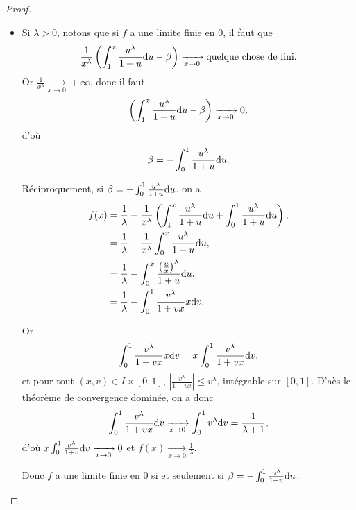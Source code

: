 \documentclass[12pt]{article}
\begin{document}
\begin{proof}
\begin{enumerate}
\begin{itemize}
\begin{itemize}
\begin{itemize}
					\item \underline{Si $\lambda>0$}, notons que si $f$ a une limite finie en 0, il faut que 
					\begin{equation}
						\frac{1}{x^{\lambda}}\left(\int_{1}^{x}\frac{u^{\lambda}}{1+u}\mathrm{d} u-\beta\right)\xrightarrow[x\to0]{}\text{quelque chose de fini.}
					\end{equation}
					Or $\frac{1}{x^{\lambda}}\xrightarrow[x\to0]{}+\infty$, donc il faut 
					\begin{equation}
						\left(\int_{1}^{x}\frac{u^{\lambda}}{1+u}\mathrm{d} u-\beta\right)\xrightarrow[x\to0]{}0,
					\end{equation}
					d'où 
					\begin{equation}
						\beta=-\int_{0}^{1}\frac{u^{\lambda}}{1+u}\mathrm{d} u.
					\end{equation}

					Réciproquement, si $\beta=-\int_{0}^{1}\frac{u^{\lambda}}{1+u}\mathrm{d} u$, on a 
					\begin{align}
						f(x)
						&=\frac{1}{\lambda}-\frac{1}{x^{\lambda}}\left(\int_{1}^{x}\frac{u^{\lambda}}{1+u}\mathrm{d} u+\int_{0}^{1}\frac{u^{\lambda}}{1+u}\mathrm{d} u\right),\\
						&=\frac{1}{\lambda}-\frac{1}{x^{\lambda}}\int_{0}^{x}\frac{u^{\lambda}}{1+u}\mathrm{d} u,\\
						&=\frac{1}{\lambda}-\int_{0}^{x}\frac{\left(\frac{u}{x}\right)^{\lambda}}{1+u}\mathrm{d} u,\\
						&=\frac{1}{\lambda}-\int_{0}^{1}\frac{v^{\lambda}}{1+vx}x\mathrm{d} v.
					\end{align}

					Or 
					\begin{equation}
						\int_{0}^{1}\frac{v^{\lambda}}{1+vx}x\mathrm{d} v=x\int_{0}^{1}\frac{v^{\lambda}}{1+vx}\mathrm{d} v,
					\end{equation}
					et pour tout $(x,v)\in I\times[0,1]$, $\left\lvert\frac{v^{\lambda}}{1+vx}\right\rvert\leqslant v^{\lambda}$, intégrable sur $[0,1]$. D'aès le théorème de convergence dominée, on a donc 
					\begin{equation}
						\int_{0}^{1}\frac{v^{\lambda}}{1+vx}\mathrm{d} v\xrightarrow[x\to0]{}\int_{0}^{1}v^{\lambda}\mathrm{d} v=\frac{1}{\lambda+1},
					\end{equation}
					d'où $x\int_{0}^{1}\frac{v^{\lambda}}{1+v}\mathrm{d} v\xrightarrow[x\to0]{}0$ et $f(x)\xrightarrow[x\to0]{}\frac{1}{\lambda}$. 

					Donc $f$ a une limite finie en 0 si et seulement si $\beta=-\int_{0}^{1}\frac{u^{\lambda}}{1+u}\mathrm{d} u$.


\end{itemize}
\end{itemize}
\end{itemize}
\end{enumerate}
\end{proof}
\end{document}
